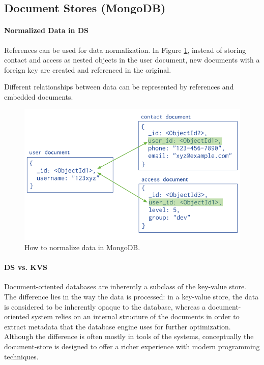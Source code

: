 






\subsection{Document Stores (MongoDB)}


\paragraph{Normalized Data in DS}
References can be used for data normalization. In Figure \ref{fig:mdb_norm}, instead of storing contact and access as nested objects in the user document, new documents with a foreign key are created and referenced in the original. 

Different relationships between data can be represented by references and embedded documents. %

\begin{figure}[h]
	\centering
	\includegraphics[scale=0.3]{images/6-mdb_norm.png}
	\caption{How to normalize data in MongoDB.}
	\label{fig:mdb_norm}
\end{figure}

\paragraph{DS vs. KVS}
Document-oriented databases are inherently a subclass of the key-value store. The difference lies in the way the data is processed: in a key-value store, the data is considered to be inherently opaque to the database, whereas a document-oriented system relies on an internal structure of the documents in order to extract metadata that the database engine uses for further optimization. Although the difference is often mostly in tools of the systems, conceptually the document-store is designed to offer a richer experience with modern programming techniques.

